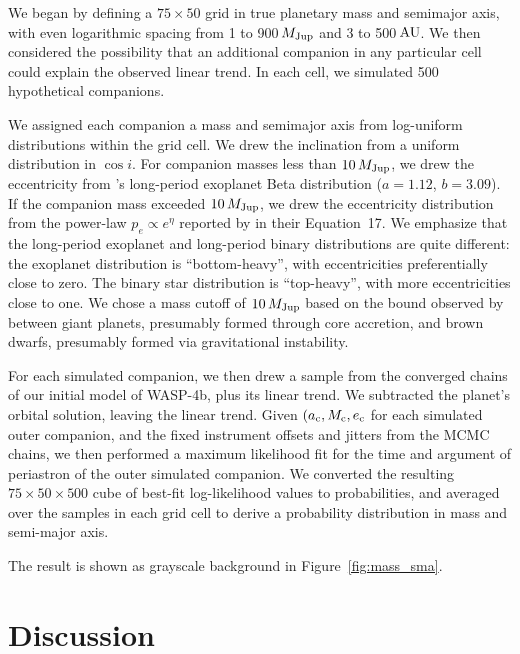 \documentclass[12pt,twocolumn,tighten]{aastex62}
\begin{document}
We began by defining a $75\times50$ grid in true planetary mass and
semimajor axis, with even logarithmic spacing from 1 to 900$\,$$M_{\rm
Jup}$ and 3 to 500$\,$${\rm AU}$.  We then considered the possibility
that an additional companion in any particular cell could explain the
observed linear trend.  In each cell, we simulated 500 hypothetical
companions.

We assigned each companion a mass and semimajor axis from log-uniform
distributions within the grid cell. We drew the inclination from a
uniform distribution in $\cos i$.  For companion masses less than
$10\,M_{\rm Jup}$, we drew the eccentricity from
\citet{kipping_beta_2013}'s long-period exoplanet Beta distribution
($a=1.12$, $b=3.09$).  If the companion mass exceeded $10\,M_{\rm
Jup}$, we drew the eccentricity distribution from the power-law $p_e
\propto e^\eta$ reported by \citet{moe_mind_2017} in their
Equation~17.  We emphasize that the long-period exoplanet and
long-period binary distributions are quite different: the exoplanet
distribution is ``bottom-heavy'', with eccentricities preferentially
close to zero. The binary star distribution is ``top-heavy'', with
more eccentricities close to one.  We chose a mass cutoff of
$10\,M_{\rm Jup}$ based on the bound observed by
\citet{schlaufman_evidence_2018} between giant planets, presumably
formed through core accretion, and brown dwarfs, presumably formed via
gravitational instability.

For each simulated companion, we then drew a sample from the converged
chains of our initial model of WASP-4b, plus its linear trend. We
subtracted the planet's orbital solution, leaving the linear trend.
Given $(a_{\rm c}, M_{\rm c}, e_{\rm c}$ for each simulated outer
companion, and the fixed instrument offsets and jitters from the MCMC
chains, we then performed a maximum likelihood fit for the time and
argument of periastron of the outer simulated companion.  We converted
the resulting $75\times50\times500$ cube of best-fit log-likelihood
values to probabilities, and averaged over the samples in each grid
cell to derive a probability distribution in mass and semi-major axis.

The result is shown as grayscale background in
Figure~\ref{fig:mass_sma}.



\section{Discussion}
\label{sec:discussion}
\end{document}
